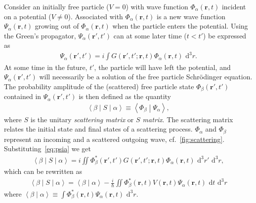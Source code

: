 \documentclass[10pt,twoside, b5paper,pdftex]{report}
\newcommand{\bracket}[2]{\ensuremath{\left\langle #1 \middle| #2 \right\rangle}}
\newcommand{\matrixel}[3]{\ensuremath{\left\langle #1 \middle| #2 \middle| #3 \right\rangle}}
\begin{document}
Consider an initially free particle ($V = 0$) with wave function $\Phi_{\alpha}(\mathbf{r},t)$  incident on a potential ($V \neq 0$). Associated with $\Phi_{\alpha}(\mathbf{r},t)$ is a new wave function $\Psi_{\alpha}(\mathbf{r},t)$ growing out of $\Phi_{\alpha}(\mathbf{r},t)$ when the particle enters the potential. Using the Green's propagator, $\Psi_{\alpha}(\mathbf{r}',t')$ can at some later time ($t<t'$) be expressed as
\begin{align}
	\Psi_{\alpha}( \mathbf{r}',t') = i\int G(\mathbf{r}',t';\mathbf{r},t)\Phi_{\alpha}( \mathbf{r},t) \mbox{ d}^{3}r. \label{eq:psia}
\end{align}
At some time in the future, $t'$, the particle will have left the potential, and $\Psi_{\alpha}(\mathbf{r}',t')$ will necessarily be a solution of the free particle Schrödinger equation. The  probability amplitude of the (scattered) free particle state $\Phi_{\beta}(\mathbf{r}',t')$ contained in $\Psi_{\alpha}(\mathbf{r}',t')$ is then defined as the quantity
\begin{align}
	\matrixel{\beta}{S}{\alpha} \equiv \bracket{\Phi_{\beta}}{\Psi_{\alpha}} \label{eq:Smat},
\end{align}
where $S$ is the unitary {\it scattering matrix} or {\it $S$ matrix}. The scattering matrix relates the initial state and final states of a scattering process. $\Phi_{\alpha}$ and $\Phi_{\beta}$  represent an incoming and a scattered outgoing wave, cf.~\cref{fig:scattering}. Substituting~\cref{eq:psia} we get
\begin{align}
	\matrixel{\beta}{S}{\alpha} = i\iint  \Phi_{\beta}^{*}(\mathbf{r}',t') G(\mathbf{r}',t';\mathbf{r},t)\Phi_{\alpha}( \mathbf{r},t) \mbox{ d}^{3}r' \mbox{ d}^{3}r,
\end{align}
which can be rewritten as 
\begin{align}
	\matrixel{\beta}{S}{\alpha} = \bracket{\beta}{\alpha} - \frac{i}{\hbar}\iint  \Phi_{\beta}^{*}(\mathbf{r},t) V(\mathbf{r},t) \Psi_{\alpha}( \mathbf{r},t) \mbox{ d}t \mbox{ d}^{3}r
\end{align}
where $\bracket{\beta}{\alpha} \equiv \int \Phi_{\beta}^{*}(\mathbf{r},t) \Psi_{\alpha}( \mathbf{r},t) \mbox{ d}^{3}r$. 
\end{document}
